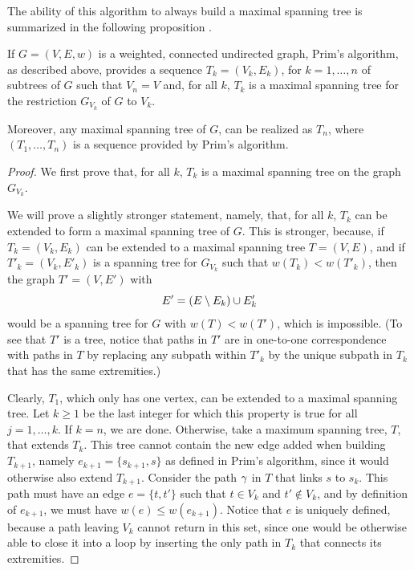 The ability of this algorithm to always build a maximal spanning tree
is summarized in the following proposition
\cite{gondran1983graphs,mchugh1990algorithm}.
\begin{proposition}
\label{prop:prim.alg}
If $G=(V, E, w)$ is a weighted, connected undirected graph, Prim's algorithm, as
described above, provides a sequence $T_k = (V_k, E_k)$, for $k=1,
\ldots, n$ of subtrees of $G$ such that $V_n=V$ and, for all $k$,
$T_k$ is a maximal spanning tree for the restriction $G_{V_k}$ of $G$
to $V_k$.

Moreover, any maximal spanning tree of $G$, can be realized as $T_n$,
where $(T_1, \ldots, T_n)$ is a sequence provided by Prim's algorithm.
\end{proposition}
\begin{proof}
We first prove that, for all $k$, $T_k$ is a maximal spanning tree on
the graph $G_{V_k}$. 

We will prove a slightly stronger statement, namely, that, for all $k$,
$T_k$ can be extended to form a maximal spanning tree of $G$. This is
stronger, because, if $T_k = (V_k, E_k)$ can be extended to a maximal spanning
tree $T = (V,E)$, and if $T'_k = (V_k, E'_k)$ is a spanning tree for
$G_{V_k}$ such that $w(T_k) < w(T'_k)$, then the graph $T'=(V, E')$ with
\[
E' = (E\setminus E_k)\cup E'_k
\]
would be a spanning tree for $G$ with $w(T) < w(T')$, which is
impossible. (To see that $T'$ is a tree, notice that paths in $T'$ are
in one-to-one correspondence with paths in $T$ by replacing any
subpath within $T'_k$ by the unique subpath in $T_k$ that has the same
extremities.)



Clearly, $T_1$, which only has one vertex, can be extended to a maximal
spanning tree. Let $k\geq 1$ be
the last integer for which this property is true for all $j = 1, \dots, k$. 
 If $k=n$, we are done. Otherwise, take a
maximum spanning tree, $T$, that extends $T_{k}$. This tree cannot
contain the new edge added when building $T_{k+1}$, namely
$e_{k+1}=\{s_{k+1}, s\}$ as defined in Prim's algorithm, since it
would otherwise also extend $T_{k+1}$. Consider the path $\gamma$ in
$T$ that links $s$ to $s_k$. This path must have an edge $e = \{t, t'\}$
such that $t\in V_{k}$ and $t'\not\in V_{k}$, and by definition of
$e_{k+1}$, we must have
$w(e) \leq w(e_{k+1})$. Notice that $e$ is uniquely defined, because a
path leaving $V_k$ cannot return in this set, since one would be
otherwise able to close it into a loop by inserting the only path in
$T_k$ that connects its extremities.


\end{proof}
